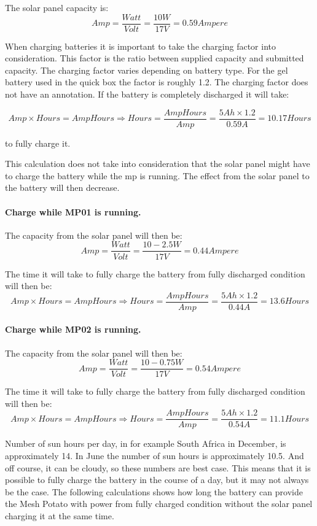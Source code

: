 The solar panel capacity is:
$$Amp = \frac{Watt}{Volt} = \frac{10 W}{17 V} = 0.59 Ampere$$

When charging batteries it is important to take the charging factor into consideration. This factor is the ratio between supplied capacity and submitted capacity. The charging factor varies depending on battery type. For the gel battery used in the \gls{quick} box the factor is roughly 1.2. The charging factor does not have an annotation. 
If the battery is completely discharged it will take: 

$$Amp\times Hours = AmpHours \Rightarrow Hours =\frac{AmpHours}{Amp} = \frac{5 Ah\times 1.2}{0.59 A} = 10.17 Hours$$

to fully charge it. 

This calculation does not take into consideration that the solar panel might have to charge the battery while the \gls{mp} is running. The effect from the solar panel to the battery will then decrease. 

\paragraph{Charge while MP01 is running.}
The capacity from the solar panel will then be: 
$$Amp = \frac{Watt}{Volt} = \frac{10-2.5 W}{17 V} = 0.44 Ampere$$

The time it will take to fully charge the battery from fully discharged condition will then be: 
$$Amp\times Hours = AmpHours \Rightarrow Hours =\frac{AmpHours}{Amp} = \frac{5 Ah\times 1.2}{0.44A} = 13.6 Hours$$

\paragraph{Charge while MP02 is running.}
The capacity from the solar panel will then be: 
$$Amp = \frac{Watt}{Volt} = \frac{10-0.75 W}{17 V} = 0.54 Ampere$$

The time it will take to fully charge the battery from fully discharged condition will then be: 
$$Amp\times Hours = AmpHours \Rightarrow Hours =\frac{AmpHours}{Amp} = \frac{5 Ah\times 1.2}{0.54A} = 11.1 Hours$$

Number of sun hours per day, in for example South Africa in December, is approximately 14. In June the number of sun hours is approximately 10.5. And off course, it can be cloudy, so these numbers are best case. This means that it is possible to fully charge the battery in the course of a day, but it may not always be the case. The following calculations shows how long the battery can provide the Mesh Potato with power from fully charged condition without the solar panel charging it at the same time. 

